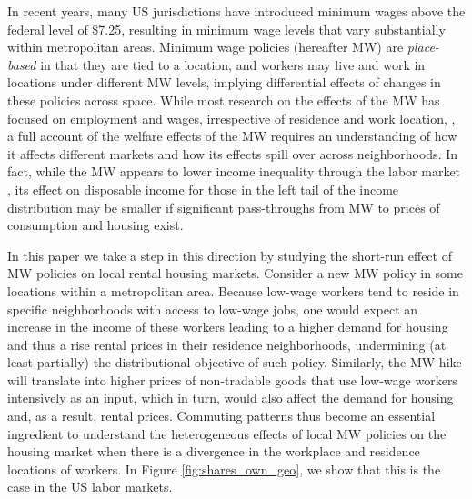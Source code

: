 

In recent years, many US jurisdictions have introduced minimum wages above the 
federal level of \$7.25, resulting in minimum wage levels that vary 
substantially within metropolitan areas.
Minimum wage policies (hereafter MW) are \textit{place-based} in that they are 
tied to a location, and workers may live and work in locations under different 
MW levels, implying differential effects of changes in these policies across space.
While most research on the effects of the MW has focused on employment and wages, 
irrespective of residence and work location,  
\parencite[e.g.,][]{CardKrueger1994, CegnizEtAl2019}, 
a full account of the welfare effects of the MW requires an understanding of 
how it affects different markets and how its effects spill over across 
neighborhoods.
In fact, while the MW appears to lower income inequality through the labor 
market \parencite{Lee1999, AutorEtAl2016},
its effect on disposable income for those in the left tail of the income 
distribution may be smaller if significant pass-throughs from MW to prices 
of consumption and housing exist.

In this paper we take a step in this direction by studying the short-run effect 
of MW policies on local rental housing markets.
Consider a new MW policy in some locations within a metropolitan area.
Because low-wage workers tend to reside in specific neighborhoods with access 
to low-wage jobs,
one would expect an increase in the income of these workers leading to a higher 
demand for housing and thus a rise rental prices in their residence neighborhoods, 
undermining (at least partially) the distributional objective of such policy.
Similarly, the MW hike will translate into higher prices of non-tradable goods 
that use low-wage workers intensively as an input, which in turn, 
would also affect the demand for housing and, as a result, rental prices.
Commuting patterns thus become an essential ingredient to understand the 
heterogeneous effects of local MW policies on the housing market when
there is a divergence in the workplace and residence locations of workers.
In Figure \ref{fig:shares_own_geo}, we show that this is the case in the US 
labor markets.

